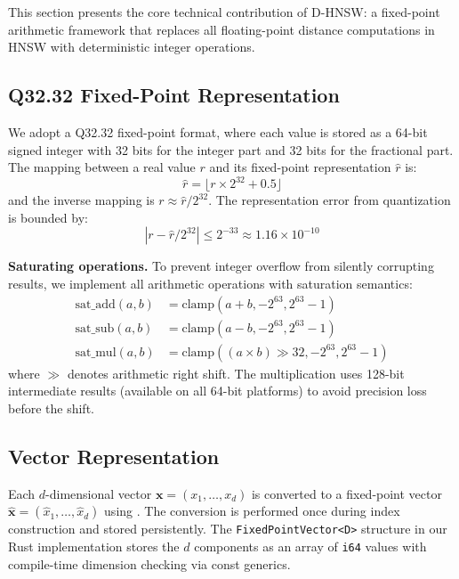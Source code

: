 \documentclass[10pt,journal,compsoc]{IEEEtran}
\newcommand{\dhnsw}{\textsc{D-HNSW}}
\newcommand{\hnsw}{\textsc{HNSW}}
\begin{document}
This section presents the core technical contribution of \dhnsw{}: a fixed-point arithmetic framework that replaces all floating-point distance computations in \hnsw{} with deterministic integer operations.

\subsection{Q32.32 Fixed-Point Representation}

We adopt a Q32.32 fixed-point format, where each value is stored as a 64-bit signed integer with 32 bits for the integer part and 32 bits for the fractional part. The mapping between a real value $r$ and its fixed-point representation $\hat{r}$ is:
\begin{equation}
  \label{eq:fp_encode}
  \hat{r} = \lfloor r \times 2^{32} + 0.5 \rfloor
\end{equation}
and the inverse mapping is $r \approx \hat{r} / 2^{32}$. The representation error from quantization is bounded by:
\begin{equation}
  |r - \hat{r}/2^{32}| \leq 2^{-33} \approx 1.16 \times 10^{-10}
\end{equation}

\textbf{Saturating operations.} To prevent integer overflow from silently corrupting results, we implement all arithmetic operations with saturation semantics:
\begin{align}
  \text{sat\_add}(a, b) &= \text{clamp}(a + b, -2^{63}, 2^{63}{-}1) \\
  \text{sat\_sub}(a, b) &= \text{clamp}(a - b, -2^{63}, 2^{63}{-}1) \\
  \text{sat\_mul}(a, b) &= \text{clamp}((a \times b) \gg 32, -2^{63}, 2^{63}{-}1)
\end{align}
where $\gg$ denotes arithmetic right shift. The multiplication uses 128-bit intermediate results (available on all 64-bit platforms) to avoid precision loss before the shift.

\subsection{Vector Representation}

Each $d$-dimensional vector $\mathbf{x} = (x_1, \ldots, x_d)$ is converted to a fixed-point vector $\hat{\mathbf{x}} = (\hat{x}_1, \ldots, \hat{x}_d)$ using . The conversion is performed once during index construction and stored persistently. The \texttt{FixedPointVector<D>} structure in our Rust implementation stores the $d$ components as an array of \texttt{i64} values with compile-time dimension checking via const generics.
\end{document}
